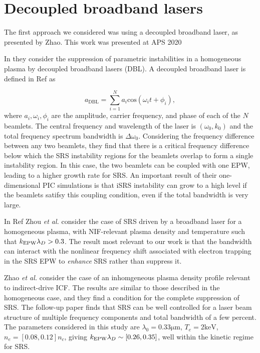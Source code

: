 \section{Decoupled broadband lasers}
The first approach we considered was using a decoupled broadband laser, as presented by Zhao. This work was presented at APS 2020

In \cite{zhao_suppression_2019} they consider the suppression of parametric
instabilities in a homogeneous plasma by decoupled broadband lasers
(\acrshort{DBL}). A
decoupled broadband laser is defined in Ref \cite{zhao_effective_2017} as

\begin{equation}\label{eqn:DBL}
  a_{\mathrm{DBL}} = \sum_{i=1}^{N} a_i \mathrm{cos}(\omega_it + \phi_i),
\end{equation}
where $a_i,\omega_i,\phi_i$ are the amplitude, carrier frequency, and phase of
each of the $N$ beamlets. The central frequency and wavelength of the laser is
$(\omega_0,k_0)$ and the total frequency spectrum bandwidth is
$\Delta\omega_0$.
Considering the frequency difference between any two beamlets, they find that
there is a critical frequency difference below which the SRS instability regions
for the beamlets overlap to form a single instability region. In this case, the
two beamlets can be coupled with one EPW, leading to a higher growth rate for
SRS. An important result of their one-dimensional PIC simulations is that iSRS
instability can grow to a high level if the beamlets satifsy this coupling
condition, even if the total bandwidth is very large.


In Ref \cite{zhou_kinetic_2018} Zhou \textit{et al.} consider the case of SRS
driven by a broadband laser for a homogeneous plasma, with NIF-relevant plasma
density and temperature such that $k_\mathrm{EPW}\lambda_D > 0.3$. The result most relevant to our
work is that the bandwidth can interact with the nonlinear frequency shift associated
with electron trapping in the SRS EPW to \emph{enhance} SRS rather than suppress it.



Zhao \textit{et al.} \cite{zhao_effective_2017} consider the case of an
inhomgeneous plasma density profile relevant to indirect-drive ICF. The results
are similar to those described in the homogeneous case, and they find a
condition for the complete suppression of SRS. The follow-up paper
\cite{zhao_suppression_2019} finds that SRS can be well controlled for a laser
beam structure of multiple frequency components and total bandwidth of a few
percent. The parameters considered in this study are
$\lambda_0=0.33\si{\micro\metre}$,
$T_e=2\si{\kilo\electronvolt}$, $n_e = [0.08,0.12]n_c$, giving $k_\mathrm{EPW}\lambda_D \sim
[0.26,0.35]$, well within the kinetic regime for SRS.

